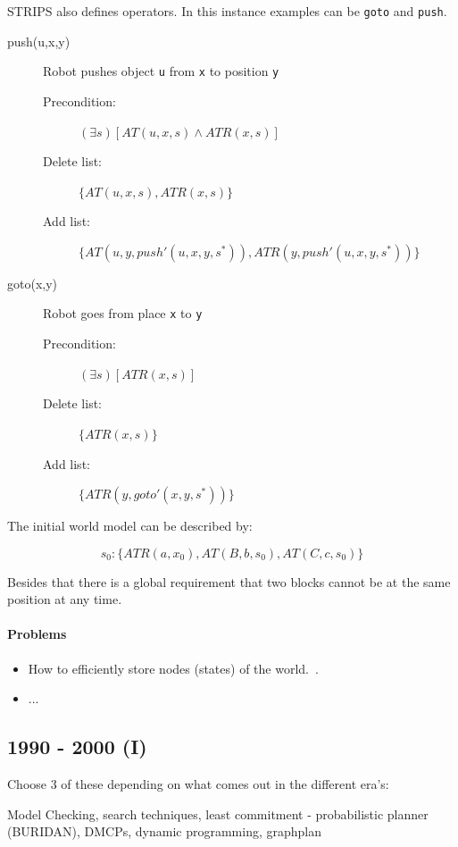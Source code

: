 \documentclass[runningheads,a4paper]{llncs}
\begin{document}
STRIPS also defines operators. In this instance examples can be \texttt{goto}
and \texttt{push}.

\begin{description}
	\item[push(u,x,y)] Robot pushes object \texttt{u} from \texttt{x} to
		position \texttt{y}
	\begin{description}
		\item[Precondition:] $(\exists s) [AT(u,x,s) \land ATR(x,s)]$
		\item[Delete list:] $\{AT(u,x,s), ATR(x,s)\}$
		\item[Add list:] $\{AT(u,y,push'(u,x,y,s^*)), ATR(y,push'(u,x,y,s^*))\}$
	\end{description}
	\item[goto(x,y)] Robot goes from place \texttt{x} to \texttt{y}
	\begin{description}
		\item[Precondition:] $(\exists s) [ATR(x,s)]$
		\item[Delete list:] $\{ATR(x,s)\}$
		\item[Add list:] $\{ATR(y,goto'(x,y,s^*))\}$
	\end{description}
\end{description}

The initial world model can be described by:

\[
	s_0 : \{ ATR(a,x_0), AT(B,b,s_0), AT(C,c,s_0) \}
\]

Besides that there is a global requirement that two blocks cannot be at the
same position at any time.

\paragraph{Problems}

\begin{itemize}
	\item How to efficiently store nodes (states) of the world.~\cite{fikes1971strips}.
	\item ...
\end{itemize}

\subsection{1990 - 2000 (I)}
Choose 3 of these depending on what comes out in the different era's:

Model Checking, search techniques, least commitment - probabilistic planner (BURIDAN), DMCPs, dynamic programming, graphplan
\end{document}
